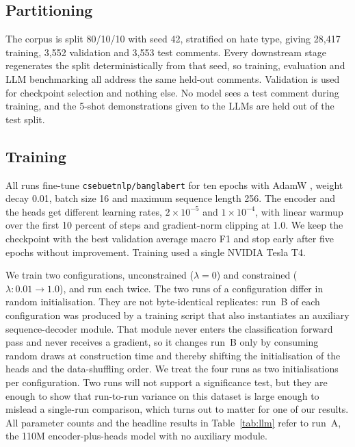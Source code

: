 \documentclass[conference]{IEEEtran}
\begin{document}
\subsection{Partitioning}
The corpus is split 80/10/10 with seed 42, stratified on hate type, giving 28{,}417 training, 3{,}552 validation and 3{,}553 test comments. Every downstream stage regenerates the split deterministically from that seed, so training, evaluation and LLM benchmarking all address the same held-out comments. Validation is used for checkpoint selection and nothing else. No model sees a test comment during training, and the 5-shot demonstrations given to the LLMs are held out of the test split.

\subsection{Training}
All runs fine-tune \texttt{csebuetnlp/banglabert} for ten epochs with AdamW \cite{loshchilov2017decoupled}, weight decay 0.01, batch size 16 and maximum sequence length 256. The encoder and the heads get different learning rates, $2 \times 10^{-5}$ and $1 \times 10^{-4}$, with linear warmup over the first 10 percent of steps and gradient-norm clipping at 1.0. We keep the checkpoint with the best validation average macro F1 and stop early after five epochs without improvement. Training used a single NVIDIA Tesla T4.

We train two configurations, unconstrained ($\lambda = 0$) and constrained ($\lambda: 0.01 \rightarrow 1.0$), and run each twice. The two runs of a configuration differ in random initialisation. They are not byte-identical replicates: run~B of each configuration was produced by a training script that also instantiates an auxiliary sequence-decoder module. That module never enters the classification forward pass and never receives a gradient, so it changes run~B only by consuming random draws at construction time and thereby shifting the initialisation of the heads and the data-shuffling order. We treat the four runs as two initialisations per configuration. Two runs will not support a significance test, but they are enough to show that run-to-run variance on this dataset is large enough to mislead a single-run comparison, which turns out to matter for one of our results. All parameter counts and the headline results in Table~\ref{tab:llm} refer to run~A, the 110M encoder-plus-heads model with no auxiliary module.
\end{document}
